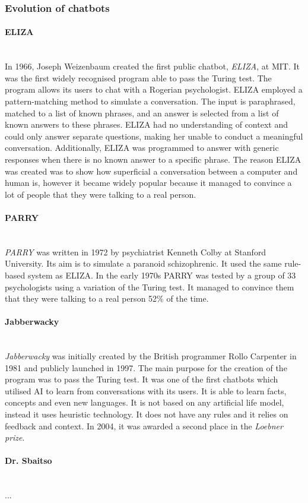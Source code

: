 \documentclass[12pt,a4paper]{article}
\newcommand{\myparagraph}[1]{\paragraph{#1}\mbox{}\\} %
\begin{document}
\subsubsection{Evolution of chatbots}
\myparagraph{ELIZA}
In 1966, Joseph Weizenbaum created the first public chatbot, \textit{ELIZA}, at MIT. It was the first widely recognised program able to pass the Turing test. The program allows its users to chat with a Rogerian psychologist. ELIZA employed a pattern-matching method to simulate a conversation. The input is paraphrased, matched to a list of known phrases, and an answer is selected from a list of known answers to these phrases. ELIZA had no understanding of context and could only answer separate questions, making her unable to conduct a meaningful conversation. Additionally, ELIZA was programmed to answer with generic responses when there is no known answer to a specific phrase. 
The reason ELIZA was created was to show how superficial a conversation between a computer and human is, however it became widely popular because it managed to convince a lot of people that they were talking to a real person. 

\myparagraph{PARRY}
\textit{PARRY} was written in 1972 by psychiatrist Kenneth Colby at Stanford University. Its aim is to simulate a paranoid schizophrenic. It used the same rule-based system as ELIZA. In the early 1970s PARRY was tested by a group of 33 psychologists using a variation of the Turing test. It managed to convince them that they were talking to a real person 52\% of the time.

\myparagraph{Jabberwacky}
\textit{Jabberwacky} was initially created by the British programmer Rollo Carpenter in 1981 and publicly launched in 1997. The main purpose for the creation of the program was to pass the Turing test. It was one of the first chatbots which utilised AI to learn from conversations with its users. It is able to learn facts, concepts and even new languages. It is not based on any artificial life model, instead it uses heuristic technology. It does not have any rules and it relies on feedback and context. In 2004, it was awarded a second place in the \textit{Loebner prize}.

\myparagraph{Dr. Sbaitso}
...
\end{document}
